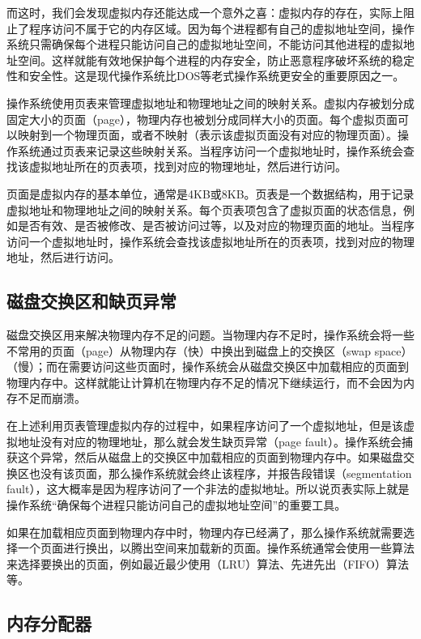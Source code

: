 而这时，我们会发现虚拟内存还能达成一个意外之喜：虚拟内存的存在，实际上阻止了程序访问不属于它的内存区域。因为每个进程都有自己的虚拟地址空间，操作系统只需确保每个进程只能访问自己的虚拟地址空间，不能访问其他进程的虚拟地址空间。这样就能有效地保护每个进程的内存安全，防止恶意程序破坏系统的稳定性和安全性。这是现代操作系统比DOS等老式操作系统更安全的重要原因之一。

操作系统使用页表来管理虚拟地址和物理地址之间的映射关系。虚拟内存被划分成固定大小的页面（page），物理内存也被划分成同样大小的页面。每个虚拟页面可以映射到一个物理页面，或者不映射（表示该虚拟页面没有对应的物理页面）。操作系统通过页表来记录这些映射关系。当程序访问一个虚拟地址时，操作系统会查找该虚拟地址所在的页表项，找到对应的物理地址，然后进行访问。

页面是虚拟内存的基本单位，通常是4KB或8KB。页表是一个数据结构，用于记录虚拟地址和物理地址之间的映射关系。每个页表项包含了虚拟页面的状态信息，例如是否有效、是否被修改、是否被访问过等，以及对应的物理页面的地址。当程序访问一个虚拟地址时，操作系统会查找该虚拟地址所在的页表项，找到对应的物理地址，然后进行访问。

\subsection{磁盘交换区和缺页异常}

磁盘交换区用来解决物理内存不足的问题。当物理内存不足时，操作系统会将一些不常用的页面（page）从物理内存（快）中换出到磁盘上的交换区（swap space）（慢）；而在需要访问这些页面时，操作系统会从磁盘交换区中加载相应的页面到物理内存中。这样就能让计算机在物理内存不足的情况下继续运行，而不会因为内存不足而崩溃。

在上述利用页表管理虚拟内存的过程中，如果程序访问了一个虚拟地址，但是该虚拟地址没有对应的物理地址，那么就会发生缺页异常（page fault）。操作系统会捕获这个异常，然后从磁盘上的交换区中加载相应的页面到物理内存中。如果磁盘交换区也没有该页面，那么操作系统就会终止该程序，并报告段错误（segmentation fault），这大概率是因为程序访问了一个非法的虚拟地址。所以说页表实际上就是操作系统“确保每个进程只能访问自己的虚拟地址空间”的重要工具。

如果在加载相应页面到物理内存中时，物理内存已经满了，那么操作系统就需要选择一个页面进行换出，以腾出空间来加载新的页面。操作系统通常会使用一些算法来选择要换出的页面，例如最近最少使用（LRU）算法、先进先出（FIFO）算法等。

\subsection{内存分配器}

